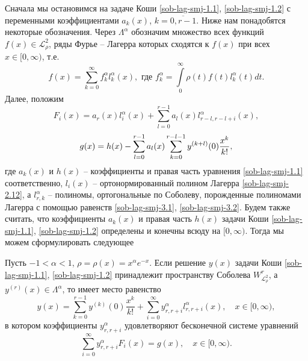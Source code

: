 Сначала мы остановимся на задаче Коши \eqref{sob-lag-smj-1.1}, \eqref{sob-lag-smj-1.2} с переменными коэффициентами $a_k(x)$, $k=\overline{0,r-1}$. Ниже нам понадобятся некоторые обозначения.
Через $\Lambda^\alpha$ обозначим множество всех функций $f(x) \in \mathcal{L}^2_\rho$, ряды Фурье -- Лагерра которых сходятся к $f(x)$ при всех $x \in [0,\infty)$, т.е.
\begin{equation*}
  f(x) = \sum\limits_{k=0}^{\infty} f_k^\alpha l_k^\alpha(x),
  \text{  где  } f_k^\alpha = \int\limits_{0}^{\infty} \rho(t)f(t)l_k^\alpha(t)dt.
\end{equation*}
Далее, положим
\begin{equation}\label{sob-lag-smj-7.2}
F_i(x)=a_r(x) l^\alpha_{i}(x)+ \sum_{l=0}^{r-1}a_l(x) l^\alpha_{r-l,r-l+i}(x),
\end{equation}
\begin{equation}\label{sob-lag-smj-7.2.1}
g(x)=h(x)-\sum_{l=0}^{r-1}a_l(x)\sum_{k=0}^{r-l-1}y^{(k+l)}(0){x^k\over k!},
\end{equation}
где $a_k(x)$ и $h(x)$ -- коэффициенты и правая часть уравнения \eqref{sob-lag-smj-1.1} соответственно, $l_i(x)$ -- ортонормированный полином Лагерра \eqref{sob-lag-smj-2.12}, а $l^\alpha_{r,k}$ -- полиномы, ортогональные по Соболеву, порожденные полиномами Лагерра с помощью равенств \eqref{sob-lag-smj-3.1}, \eqref{sob-lag-smj-3.2}. Будем также считать, что коэффициенты $a_k(x)$ и правая часть $h(x)$ задачи Коши \eqref{sob-lag-smj-1.1}, \eqref{sob-lag-smj-1.2} определены и конечны всюду на $[0,\infty)$. Тогда мы можем сформулировать следующее

\begin{statement}
Пусть $-1<\alpha<1$, $\rho=\rho(x)=x^\alpha e^{-x}$. Если решение $y(x)$ задачи Коши \eqref{sob-lag-smj-1.1}, \eqref{sob-lag-smj-1.2} принадлежит пространству Соболева $W^{r}_{\mathcal{L}_{\rho}^2}$, а $y^{(r)}(x) \in \Lambda^\alpha$, то имеет место равенство
\begin{equation*}
y(x)= \sum_{k=0}^{r-1} y^{(k)}(0)\frac{x^k}{k!}+ \sum_{i=0}^\infty y_{r,r+i}^\alpha l_{r,r+i}^\alpha(x), \quad x \in [0,\infty),
\end{equation*}
в котором коэффициенты $y^\alpha_{r,r+i}$ удовлетворяют бесконечной системе уравнений
\begin{equation}\label{sob-lag-smj-7.3}
\sum_{i=0}^\infty y^\alpha_{r,r+i}F_i(x)=g(x), \quad x\in [0,\infty).
\end{equation}
\end{statement}

